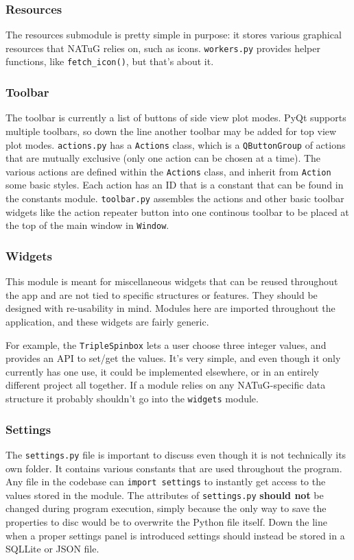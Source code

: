 \documentclass[titlepage]{article}
\begin{document}
	\subsubsection{Resources}
	The resources submodule is pretty simple in purpose: it stores various graphical resources that NATuG relies on, such as icons. \texttt{workers.py} provides helper functions, like \texttt{fetch\_icon()}, but that's about it.
	
	\subsubsection{Toolbar}
	The toolbar is currently a list of buttons of side view plot modes. PyQt supports multiple toolbars, so down the line another toolbar may be added for top view plot modes. \texttt{actions.py} has a \texttt{Actions} class, which is a \texttt{QButtonGroup} of actions that are mutually exclusive (only one action can be chosen at a time). The various actions are defined within the \texttt{Actions} class, and inherit from \texttt{Action} some basic styles. Each action has an ID that is a constant that can be found in the constants module. \texttt{toolbar.py} assembles the actions and other basic toolbar widgets like the action repeater button into one continous toolbar to be placed at the top of the main window in \texttt{Window}.
	
	\subsubsection{Widgets}
	This module is meant for miscellaneous widgets that can be reused throughout the app and are not tied to specific structures or features. They should be designed with re-usability in mind. Modules here are imported throughout the application, and these widgets are fairly generic.
	
	For example, the \texttt{TripleSpinbox} lets a user choose three integer values, and provides an API to set/get the values. It's very simple, and even though it only currently has one use, it could be implemented elsewhere, or in an entirely different project all together. If a module relies on any NATuG-specific data structure it probably shouldn't go into the \texttt{widgets} module.
	
	\subsubsection{Settings}
	The \texttt{settings.py} file is important to discuss even though it is not technically its own folder. It contains various constants that are used throughout the program. Any file in the codebase can \texttt{import settings} to instantly get access to the values stored in the module. The attributes of \texttt{settings.py} \textbf{should not} be changed during program execution, simply because the only way to save the properties to disc would be to overwrite the Python file itself. Down the line when a proper settings panel is introduced settings should instead be stored in a SQLLite or JSON file.
	
\end{document}
